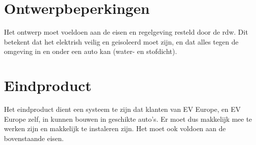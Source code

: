 \section{Ontwerpbeperkingen}

Het ontwerp moet voeldoen aan de eisen en regelgeving resteld door de \ac{rdw}.
Dit betekent dat het elektrish veilig en geisoleerd moet zijn, en dat alles
tegen de omgeving in en onder een auto kan (water- en stofdicht).

\section{Eindproduct}

Het eindproduct dient een systeem te zijn dat klanten van EV Europe, en EV
Europe zelf, in kunnen bouwen in geschikte auto's. Er moet dus makkelijk mee te
werken zijn en makkelijk te instaleren zijn. Het moet ook voldoen aan de
bovenstaande eisen.
